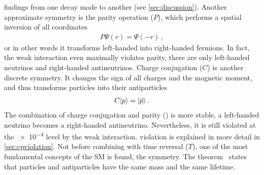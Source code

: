 findings from one decay mode to another (see \cref{sec:discussion}).
Another approximate symmetry is the parity operation ($P$), which performs a
spatial inversion of all coordinates
\begin{align}
	P\Psi(r) = \Psi(-r)\,,
\end{align}
or in other words it transforms left-handed into right-handed fermions. In
fact, the weak interaction even maximally violates parity, \eg there are only
left-handed neutrinos and right-handed antineutrinos. Charge conjugation ($C$)
is another discrete symmetry. It changes the sign of all charges and the
magnetic moment, and thus transforms particles into their antiparticles
\begin{align}
	C |p\rangle = |\bar p\rangle\,.
\end{align}
The combination of charge conjugation and parity (\CP) is more stable,
\eg a left-handed neutrino becomes a right-handed antineutrino. Nevertheless,
it is still violated at the \num{e-4} level by the weak interaction. \CP
violation is explained in more detail in \cref{sec:cpviolation}. Not before
combining \CP with time reversal ($T$), one of the most fundamental concepts
of the SM is found, the \CPT symmetry. The \CPT
theorem~\cite{Schwinger:1951xk,Luders:1954zz,pauli1955niels} states that
particles and antiparticles have the same mass and the same lifetime.
